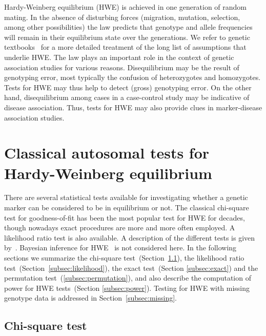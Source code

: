 \documentclass[nojss]{jss}
\begin{document}
Hardy-Weinberg equilibrium (HWE) is achieved in one generation of
random mating. In the absence of disturbing forces (migration,
mutation, selection, among other possibilities) the law predicts that
genotype and allele frequencies will remain in their equilibrium state
over the generations. We refer to genetic textbooks~\citep{Crow,Hartl}
for a more detailed treatment of the long list of assumptions that
underlie HWE. The law plays an important role in the context of
genetic association studies for various reasons. Disequilibrium may be
the result of genotyping error, most typically the confusion of
heterozygotes and homozygotes. Tests for HWE may thus help to detect
(gross) genotyping error. On the other hand, disequilibrium among
cases in a case-control study may be indicative of disease
association. Thus, tests for HWE may also provide clues in
marker-disease association studies.
\section{Classical autosomal tests for Hardy-Weinberg equilibrium}
\label{sec:tests}

There are several statistical tests available for investigating
whether a genetic marker can be considered to be in equilibrium or
not. The classical chi-square test for goodness-of-fit has been the
most popular test for HWE for decades, though nowadays exact
procedures are more and more often employed. A likelihood ratio test
is also available. A description of the different tests is given
by~\citet[Chapter 3]{Weir}. Bayesian inference for
HWE~\citep{Lindley,Ayres,Shoemaker,Wakefield,Consonni} is not
considered here. In the following sections we summarize the chi-square
test~(Section~\ref{subsec:chisquare}), the likelihood ratio
test~(Section~\ref{subsec:likelihood}), the exact test~(Section
\ref{subsec:exact}) and the permutation test~(\ref{subsec:permutation}), and also describe the computation of power for
HWE tests~(Section \ref{subsec:power}). Testing for HWE with missing
genotype data is addressed in Section~\ref{subsec:missing}.

\subsection{Chi-square test}
\label{subsec:chisquare}
\end{document}

